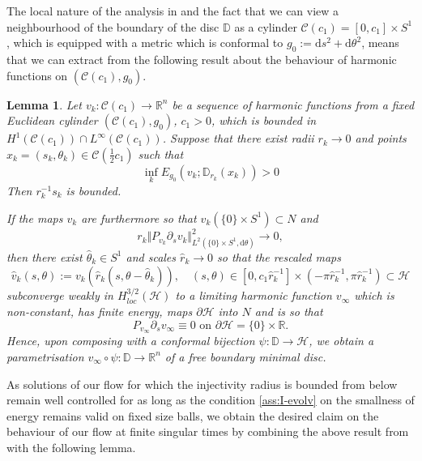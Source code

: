 \documentclass[10pt,reqno]{amsart}
\theoremstyle{plain}
\newtheorem{lemma}{Lemma}[section]
\theoremstyle{definition}
\numberwithin{equation}{section}
\newcommand{\R}{\ensuremath{{\mathbb R}}}
\newcommand{\norm}[1]{\Vert#1\Vert}
\newcommand{\half}{\frac{1}{2}}
\newcommand{\dd}{\mathrm{d}} %
\newcommand{\ps}{\partial_s}
\newcommand{\Cyl}{{\mathscr{C}}}
\newcommand{\HH}{\mathcal{H}} %
\newcommand{\DD}{\mathbb{D}}
\newcommand{\p}{\partial} %
\begin{document}
The local nature of the analysis in \cite{S} and the fact that we can view a neighbourhood of the boundary of the disc $\DD$ as a cylinder $\Cyl(c_1)=[0,c_1]\times S^1$, which is equipped with a metric which is conformal to $g_0:=\dd s^2+\dd \theta^2$, means that we can 
extract from \cite{S} the following result about the behaviour of harmonic functions on $(\Cyl(c_1),g_0)$.


\begin{lemma}\label{lemma:seq_cyl_bubble}
    Let $v_k: \Cyl(c_1) \to \R^n$ be a sequence of harmonic functions from a fixed Euclidean cylinder $(\Cyl(c_1),g_0)$, $c_1>0$, which is bounded in $H^1(\Cyl(c_1))\cap L^\infty(\Cyl(c_1))$. Suppose that there exist radii $r_k \to 0$ and points $x_k=(s_k,\theta_k)\in \Cyl(\half c_1)$ such that
    \begin{equation*}
        \inf_k	E_{g_0}(v_k;\DD_{r_k}(x_k)) >0 
    \end{equation*}
    Then $r_k^{-1} s_k$ is bounded.
    
    If the maps $v_k$ are furthermore so that $v_k(\{0\}\times S^1)\subset N$ and     
    \begin{equation}\label{est:seq_bubble_tension}
    	r_k\norm{P_{v_k} \partial_s v_k }_{L^2(\{0\}\times S^1,\dd \theta)}^2 \rightarrow 0,
    \end{equation}
    then there exist $\hat{\theta}_k\in S^1$ and scales $\hat r_k\to 0$ so that the rescaled maps 
    \begin{equation*}
        \hat{v}_k(s,\theta):=v_k(\hat{r}_k(s,\theta-\hat{\theta}_k)), \quad (s,\theta)\in [0,c_1\hat{r}_k^{-1}] \times (-\pi\hat{r}_k^{-1},\pi \hat{r}_k^{-1})\subset \HH
    \end{equation*}
    subconverge weakly in $H^{3/2}_{loc}(\HH)$ to a limiting harmonic function $v_\infty$ which is non-constant, has finite energy, maps $\p\HH$ into $N$ and is so that  
    \begin{equation*}
        P_{v_\infty} \ps v_\infty \equiv 0 \text{ on } \partial \HH=\{0\}\times \R.
    \end{equation*}
    Hence, upon composing with a conformal bijection $\psi:\DD \rightarrow \HH$, we obtain a parametrisation $v_\infty \circ \psi:\DD\to \R^n$ of a free boundary minimal disc.
\end{lemma}

As solutions of our flow for which the injectivity radius is bounded from below remain well controlled for as long as the condition \eqref{ass:I-evolv} on the smallness of energy remains valid on fixed size balls, we obtain the desired claim on the behaviour of our flow at finite singular times by combining the above result from \cite{S} with the following lemma. 
\end{document}
